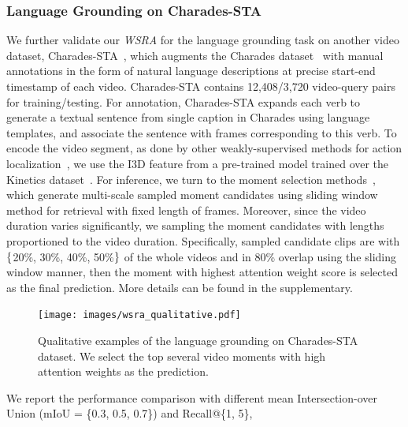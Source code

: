 \subsubsection{Language Grounding on Charades-STA}
We further validate our \textit{WSRA} for the language grounding task on another video dataset, 
Charades-STA~\citep{gao2017tall},
which augments the Charades dataset~\citep{actorobserver,sigurdsson2017asynchronous}  with
manual annotations in the form of 
natural language descriptions at precise start-end timestamp of each video.
Charades-STA contains 12,408/3,720 video-query pairs for training/testing. 
For annotation,
Charades-STA expands each verb to generate a textual sentence
from single caption in Charades using language templates, 
and associate the sentence with frames corresponding to this verb.
To encode the video segment,
as done by other weakly-supervised methods 
for action localization~\citep{nguyen2018weakly,paul2018w},
we use the I3D feature from a pre-trained model trained over 
the Kinetics dataset~\citep{carreira2017quo}. 
For inference, we turn to the moment selection methods~\citep{gao2017tall},
which generate multi-scale sampled moment candidates using sliding window method for retrieval with fixed length of frames. 
Moreover, 
since the  video duration varies significantly, we sampling the moment 
candidates with lengths proportioned to the video duration.
Specifically, sampled candidate clips are with $\small\{$20\%, 30\%, 40\%, 50\%$\small\}$ of the whole videos and in 80\% overlap using the sliding window manner, then the moment with highest attention weight score is selected as the final prediction. More details can be found in the supplementary.
\begin{figure}[t]
\texttt{[image: images/wsra\_qualitative.pdf]}
\centering
\caption{\small Qualitative examples of the language grounding on Charades-STA dataset. We select the top several video moments with high attention weights as the prediction.}
\label{figure:qualitative}
\end{figure}
We report the performance comparison with
different mean Intersection-over Union (mIoU = \{0.3, 0.5, 0.7\}) and Recall@\{1, 5\}, 

